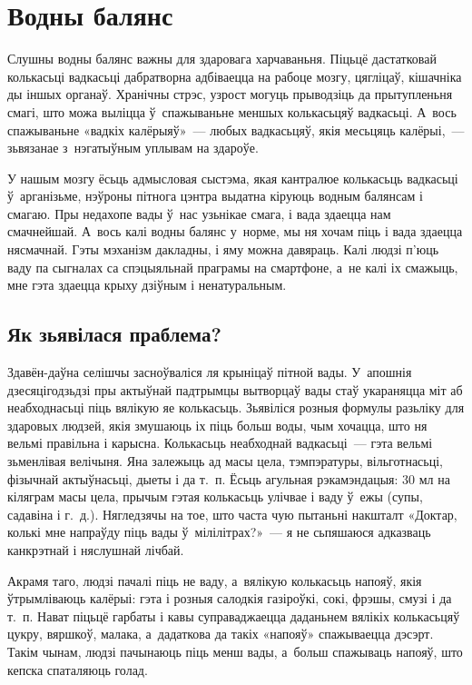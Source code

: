 \chapter{Водны балянс}

Слушны водны балянс важны для здаровага харчаваньня. Піцьцё дастатковай колькасьці вадкасьці дабратворна адбіваецца на рабоце мозгу, цягліцаў, кішачніка ды іншых органаў. Хранічны стрэс, узрост могуць прыводзіць да прытупленьня смагі, што можа выліцца ў~спажываньне меншых колькасьцяў вадкасьці. А~вось спажываньне «вадкіх калёрыяў»~--- любых вадкасьцяў, якія месьцяць калёрыі,~--- зьвязанае з~нэгатыўным уплывам на здароўе.

У нашым мозгу ёсьць адмысловая сыстэма, якая кантралюе колькасьць вадкасьці ў~арганізьме, нэўроны пітнога цэнтра выдатна кіруюць водным балянсам і смагаю. Пры недахопе вады ў~нас узьнікае смага, і вада здаецца нам смачнейшай. А~вось калі водны балянс у~норме, мы ня хочам піць і вада здаецца нясмачнай. Гэты мэханізм дакладны, і яму можна давяраць. Калі людзі п'юць ваду па сыгналах са спэцыяльнай праграмы на смартфоне, а~не калі іх смажыць, мне гэта здаецца крыху дзіўным і ненатуральным.

\section{Як зьявілася праблема?}

Здавён-даўна селішчы засноўваліся ля крыніцаў пітной вады. У~апошнія дзесяцігодзьдзі пры актыўнай падтрымцы вытворцаў вады стаў укараняцца міт аб неабходнасьці піць вялікую яе колькасьць. Зьявіліся розныя формулы разьліку для здаровых людзей, якія змушаюць іх піць больш воды, чым хочацца, што ня вельмі правільна і карысна. Колькасьць неабходнай вадкасьці~--- гэта вельмі зьменлівая велічыня. Яна залежыць ад масы цела, тэмпэратуры, вільготнасьці, фізычнай актыўнасьці, дыеты і да т.~п. Ёсьць агульная рэкамэндацыя: 30 мл на кіляграм масы цела, прычым гэтая колькасьць улічвае і ваду ў~ежы (супы, садавіна і г.~д.). Нягледзячы на тое, што часта чую пытаньні накшталт «Доктар, колькі мне напраўду піць вады ў~мілілітрах?»~--- я не сьпяшаюся адказваць канкрэтнай і няслушнай лічбай.

Акрамя таго, людзі пачалі піць не ваду, а~вялікую колькасьць напояў, якія ўтрымліваюць калёрыі: гэта і розныя салодкія газіроўкі, сокі, фрэшы, смузі і да т.~п. Нават піцьцё гарбаты і кавы суправаджаецца даданьнем вялікіх колькасьцяў цукру, вяршкоў, малака, а~дадаткова да такіх «напояў» спажываецца дэсэрт. Такім чынам, людзі пачынаюць піць менш вады, а~больш спажываць напояў, што кепска спаталяюць голад.

